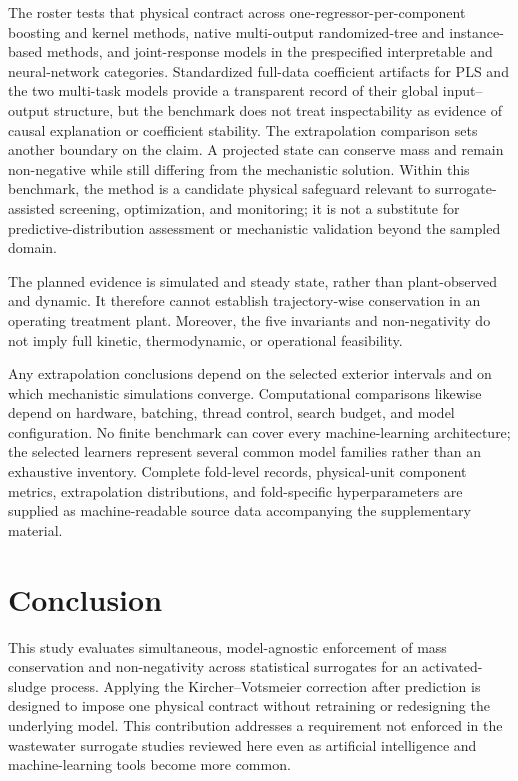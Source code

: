 \documentclass[a4paper,fleqn]{cas-sc}
\begin{document}
The roster tests that physical contract across one-regressor-per-component boosting and kernel methods, native multi-output randomized-tree and instance-based methods, and joint-response models in the prespecified interpretable and neural-network categories. Standardized full-data coefficient artifacts for PLS and the two multi-task models provide a transparent record of their global input--output structure, but the benchmark does not treat inspectability as evidence of causal explanation or coefficient stability.
The extrapolation comparison sets another boundary on the claim. A projected state can conserve mass and remain non-negative while still differing from the mechanistic solution. Within this benchmark, the method is a candidate physical safeguard relevant to surrogate-assisted screening, optimization, and monitoring; it is not a substitute for predictive-distribution assessment or mechanistic validation beyond the sampled domain.

The planned evidence is simulated and steady state, rather than plant-observed and dynamic. It therefore cannot establish trajectory-wise conservation in an operating treatment plant. Moreover, the five invariants and non-negativity do not imply full kinetic, thermodynamic, or operational feasibility.

Any extrapolation conclusions depend on the selected exterior intervals and on which mechanistic simulations converge. Computational comparisons likewise depend on hardware, batching, thread control, search budget, and model configuration. No finite benchmark can cover every machine-learning architecture; the selected learners represent several common model families rather than an exhaustive inventory. Complete fold-level records, physical-unit component metrics, extrapolation distributions, and fold-specific hyperparameters are supplied as machine-readable source data accompanying the supplementary material.

\FloatBarrier
\section{Conclusion}

This study evaluates simultaneous, model-agnostic enforcement of mass conservation and non-negativity across statistical surrogates for an activated-sludge process. Applying the Kircher--Votsmeier correction after prediction is designed to impose one physical contract without retraining or redesigning the underlying model. This contribution addresses a requirement not enforced in the wastewater surrogate studies reviewed here even as artificial intelligence and machine-learning tools become more common.
\end{document}
